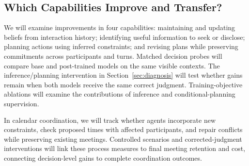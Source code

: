 \documentclass[11pt,a4paper]{article}
\begin{document}
\subsection{Which Capabilities Improve and Transfer?}
We will examine improvements in four capabilities: maintaining and updating
beliefs from interaction history; identifying useful information to seek
or disclose; planning actions using inferred constraints; and revising
plans while preserving commitments across participants and turns. Matched
decision probes will compare base and post-trained models on the same
visible contexts. The inference/planning intervention in
Section~\ref{sec:diagnosis} will test whether gains remain when both models
receive the same correct judgment. Training-objective ablations will
examine the contributions of inference and conditional-planning supervision.

In calendar coordination, we will track whether agents incorporate new
constraints, check proposed times with affected participants, and repair
conflicts while preserving existing meetings. Controlled scenarios and
corrected-judgment interventions will link these process measures to final
meeting retention and cost, connecting decision-level gains to complete
coordination outcomes.

\clearpage
\begingroup
\small{}\raggedright
\setlength{\parskip}{0pt}


\endgroup
\end{document}
